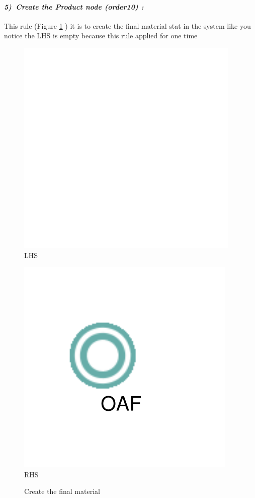 \paragraph{\emph{5)~Create the Product node (order10) :} }
 
 
This rule (Figure \ref{fig:Create the final material} ) 
it is to create the final material stat in the system like you notice the LHS is empty
because this rule applied for one time 


\vspace{1cm}
\begin{figure}[th]
\centering
\begin{minipage}{.5\textwidth}
  \begin{center}
  \includegraphics[width=.6\linewidth]{chapiter3/img/L5}
  LHS
  \end{center}
  
\end{minipage}%
\begin{minipage}{.5\textwidth}
  \begin{center}
  \includegraphics[width=.6\linewidth]{chapiter3/img/R5}
  RHS 
  \end{center}
\end{minipage}
\caption{\label{fig:Create the final material}Create the final material}
 
\end{figure}
\vspace{1cm}

